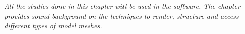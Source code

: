\underline{ \hspace{\textwidth} } 
\textit{All the studies done in this chapter will be used in the software. The chapter provides sound background on the techniques to render, structure and access different types of model meshes.}\\
\underline{ \hspace{\textwidth} }